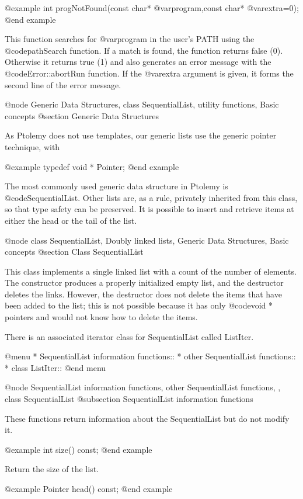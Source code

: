 @example
int progNotFound(const char* @var{program},const char* @var{extra}=0);
@end example

This function searches for @var{program} in the user's PATH using the
@code{pathSearch} function.  If a match is found, the function returns
false (0).  Otherwise it returns true (1) and also generates an error
message with the @code{Error::abortRun} function.  If the @var{extra}
argument is given, it forms the second line of the error message.

@node Generic Data Structures, class SequentialList, utility functions, Basic concepts
@section Generic Data Structures

As Ptolemy does not use templates, our generic lists use the generic pointer
technique, with

@example
typedef void * Pointer;
@end example

The most commonly used generic data structure in Ptolemy is
@code{SequentialList}.  Other lists are, as a rule, privately inherited
from this class, so that type safety can be preserved.  It is possible
to insert and retrieve items at either the head or the tail of the list.

@node class SequentialList, Doubly linked lists, Generic Data Structures, Basic concepts
@section Class SequentialList

This class implements a single linked list with a count of the number of
elements.  The constructor produces a properly initialized empty list,
and the destructor deletes the links.  However, the destructor does
not delete the items that have been added to the list; this is not
possible because it has only @code{void *} pointers and would not know
how to delete the items.

There is an associated iterator class for SequentialList called ListIter.

@menu
* SequentialList information functions::  
* other SequentialList functions::  
* class ListIter::  
@end menu

@node SequentialList information functions, other SequentialList functions,  , class SequentialList
@subsection SequentialList information functions

These functions return information about the SequentialList but do not
modify it.

@example
int size() const;
@end example

Return the size of the list.

@example
Pointer head() const;
@end example

